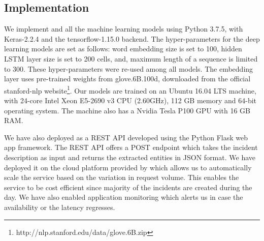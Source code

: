 

\subsection{Implementation}

We implement \softner{} and all the machine learning models using Python 3.7.5, with Keras-2.2.4 and the tensorflow-1.15.0 backend. The hyper-parameters for the deep learning models are set as follows: word embedding size is set to 100, hidden LSTM layer size is set to 200 cells, and, maximum length of a sequence is limited to 300. These hyper-parameters were re-used among all models. The embedding layer uses pre-trained weights from glove.6B.100d, downloaded from the official stanford-nlp website\footnote{http://nlp.stanford.edu/data/glove.6B.zip}. Our models are trained on an Ubuntu 16.04 LTS machine, with 24-core Intel Xeon E5-2690 v3 CPU (2.60GHz), 112 GB memory and 64-bit operating system. The machine also has a Nvidia Tesla P100 GPU with 16 GB RAM.

We have also deployed \softner{} as a REST API developed using the Python Flask web app framework. The REST API offers a POST endpoint which takes the incident description as input and returns the extracted entities in JSON format. We have deployed it on the cloud platform provided by \CompanyX{} which allows us to automatically scale the service based on the variation in request volume. This enables the service to be cost efficient since majority of the incidents are created during the day. We have also enabled application monitoring which alerts us in case the availability or the latency regresses.